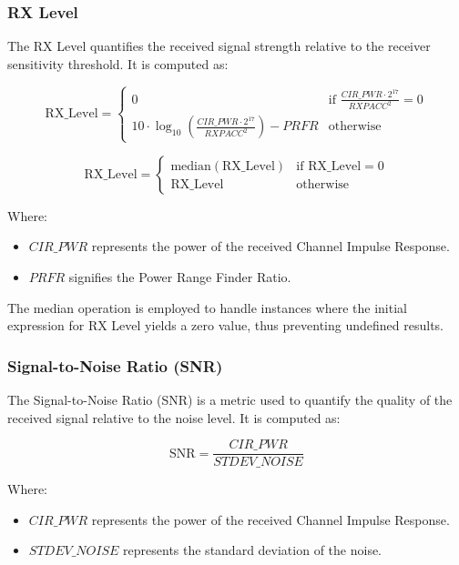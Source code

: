 \documentclass[
	a4paper, %
	11pt, %
]{CSUniSchoolLabReport}
\begin{document}
\subsubsection{RX Level}\label{rx_level}

The RX Level quantifies the received signal strength relative to the receiver sensitivity threshold. It is computed as:

\[
\text{RX\_Level} = 
\begin{cases} 
0 & \text{if } \frac{{CIR\_PWR \cdot 2^{17}}}{{RXPACC^2}} = 0 \\
10 \cdot \log_{10}\left(\frac{{CIR\_PWR \cdot 2^{17}}}{{RXPACC^2}}\right) - PRFR & \text{otherwise}
\end{cases}
\]

\[
\text{RX\_Level} = 
\begin{cases} 
\text{median}(\text{RX\_Level}) & \text{if } \text{RX\_Level} = 0 \\
\text{RX\_Level} & \text{otherwise}
\end{cases}
\]

Where:
\begin{itemize}
    \item $CIR\_PWR$ represents the power of the received Channel Impulse Response.
    \item $PRFR$ signifies the Power Range Finder Ratio.
\end{itemize}

The median operation is employed to handle instances where the initial expression for RX Level yields a zero value, thus preventing undefined results.

\subsubsection{Signal-to-Noise Ratio (SNR)}\label{snr}

The Signal-to-Noise Ratio (SNR) is a metric used to quantify the quality of the received signal relative to the noise level. It is computed as:

\[
\text{SNR} = \frac{{CIR\_PWR}}{{STDEV\_NOISE}}
\]

Where:
\begin{itemize}
    \item $CIR\_PWR$ represents the power of the received Channel Impulse Response.
    \item $STDEV\_NOISE$ represents the standard deviation of the noise.
\end{itemize}
\end{document}
